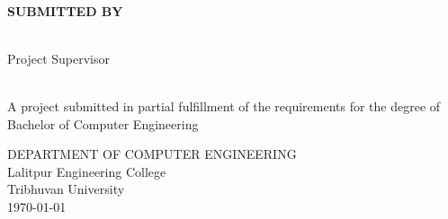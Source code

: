 \begin{center}
    \linespread{1.6}
    \thispagestyle{empty}
    \textbf{\large{\thetitle}} \\
    \vspace{2cm}

    \textbf{SUBMITTED BY} \\
    {\theauthor} \\

    \vspace{2cm}

    Project Supervisor\\
    {\thesupervisor} \\

    \vspace{2.2cm}

    A project submitted in partial fulfillment of the requirements for the degree of\\
    Bachelor of Computer Engineering

    \vspace{3cm}

    DEPARTMENT OF COMPUTER ENGINEERING \\
    Lalitpur Engineering College\\
    Tribhuvan University\\
    \vspace{2.4 in}
    \today

\end{center}
